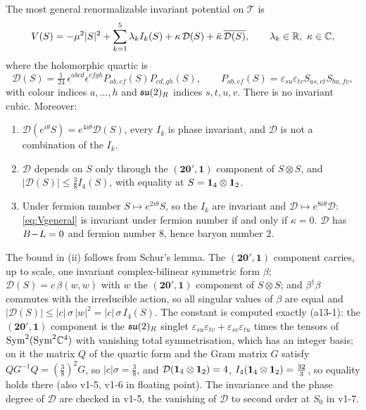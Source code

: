 \begin{theorem}
\label{thm:potential}
The most general renormalizable invariant potential on $\mathcal T$ is
\begin{equation}
\label{eq:Vgeneral}
V(S)=-\mu^2|S|^2+\sum_{k=1}^5\lambda_kI_k(S)+\kappa\,\mathcal D(S)+\bar\kappa\,\overline{\mathcal D(S)},\qquad \lambda_k\in\R,\ \kappa\in\C,
\end{equation}
where the holomorphic quartic is
\[
\mathcal D(S)=\tfrac1{24}\,\epsilon^{abcd}\epsilon^{efgh}P_{ab,ef}(S)P_{cd,gh}(S),\qquad P_{ab,ef}(S)=\varepsilon_{su}\varepsilon_{tv}S_{as,et}S_{bu,fv},
\]
with colour indices $a,\dots,h$ and $\mathfrak{su}(2)_R$ indices $s,t,u,v$. There is no invariant cubic. Moreover:
\begin{enumerate}[label=(\roman*),leftmargin=2.2em]
\item $\mathcal D(e^{i\theta}S)=e^{4i\theta}\mathcal D(S)$, every $I_k$ is phase invariant, and $\mathcal D$ is not a combination of the $I_k$.
\item $\mathcal D$ depends on $S$ only through the $(\mathbf{20}',\mathbf1)$ component of $S\otimes S$, and $|\mathcal D(S)|\le\tfrac38I_4(S)$, with equality at
$S=\mathbf 1_4\otimes\mathbf 1_2$.
\item Under fermion number $S\mapsto e^{2i\theta}S$, so the $I_k$ are invariant and $\mathcal D\mapsto e^{8i\theta}\mathcal D$: \eqref{eq:Vgeneral} is invariant
under fermion number if and only if $\kappa=0$. $\mathcal D$ has $B\!-\!L=0$ and fermion number $8$, hence baryon number $2$.
\end{enumerate}
\end{theorem}

The bound in (ii) follows from Schur's lemma. The $(\mathbf{20}',\mathbf1)$ component carries, up to scale, one invariant complex-bilinear symmetric
form $\beta$; $\mathcal D(S)=c\,\beta(w,w)$ with $w$ the $(\mathbf{20}',\mathbf1)$ component of $S\otimes S$; and $\beta^\dagger\beta$ commutes with the irreducible action,
so all singular values of $\beta$ are equal and $|\mathcal D(S)|\le|c|\,\sigma\,|w|^2=|c|\,\sigma\,I_4(S)$. The constant is computed exactly
(a13-1): the $(\mathbf{20}',\mathbf1)$ component is the $\mathfrak{su}(2)_R$ singlet $\varepsilon_{su}\varepsilon_{tv}+\varepsilon_{sv}\varepsilon_{tu}$ times the tensors of
$\mathrm{Sym}^2(\mathrm{Sym}^2\mathbb{C}^4)$ with vanishing total symmetrisation, which has an integer basis; on it the matrix $Q$ of the quartic form and the Gram
matrix $G$ satisfy $QG^{-1}Q=(\tfrac38)^2G$, so $|c|\sigma=\tfrac38$, and $\mathcal D(\mathbf 1_4\otimes\mathbf 1_2)=4$, $I_4(\mathbf 1_4\otimes\mathbf 1_2)=\tfrac{32}3$, so equality holds
there (also v1-5, v1-6 in floating point). The invariance and the phase degree of $\mathcal D$ are checked in v1-5,
the vanishing of $\mathcal D$ to second order at $S_0$ in v1-7.

